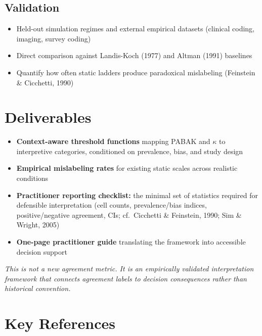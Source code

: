 \documentclass[11pt]{article}
\begin{document}
\subsection*{Validation}
\begin{itemize}[nosep, leftmargin=1.5em]
    \item Held-out simulation regimes and external empirical datasets (clinical coding, imaging, survey coding)
    \item Direct comparison against Landis-Koch (1977) and Altman (1991) baselines
    \item Quantify how often static ladders produce paradoxical mislabeling (Feinstein \& Cicchetti, 1990)
\end{itemize}

\section*{Deliverables}

\begin{itemize}[nosep, leftmargin=1.5em]
    \item \textbf{Context-aware threshold functions} mapping PABAK and $\kappa$ to interpretive categories, conditioned on prevalence, bias, and study design
    \item \textbf{Empirical mislabeling rates} for existing static scales across realistic conditions
    \item \textbf{Practitioner reporting checklist:} the minimal set of statistics required for defensible interpretation (cell counts, prevalence/bias indices, positive/negative agreement, CIs; cf.\ Cicchetti \& Feinstein, 1990; Sim \& Wright, 2005)
    \item \textbf{One-page practitioner guide} translating the framework into accessible decision support
\end{itemize}

\vspace{4pt}
\noindent\textit{This is not a new agreement metric. It is an empirically validated interpretation framework that connects agreement labels to decision consequences rather than historical convention.}

\section*{Key References}
\end{document}
